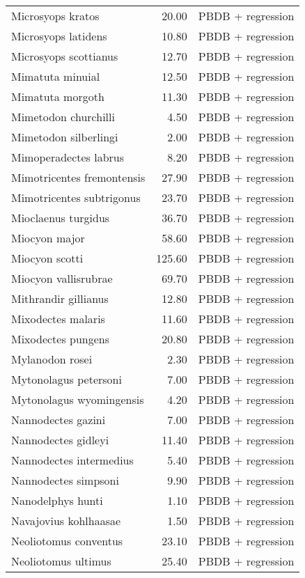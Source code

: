 \begin{table}[ht]
\begin{tabular}{lrl}
  Microsyops kratos & 20.00 & PBDB + regression \\ 
  Microsyops latidens & 10.80 & PBDB + regression \\ 
  Microsyops scottianus & 12.70 & PBDB + regression \\ 
  Mimatuta minuial & 12.50 & PBDB + regression \\ 
  Mimatuta morgoth & 11.30 & PBDB + regression \\ 
  Mimetodon churchilli & 4.50 & PBDB + regression \\ 
  Mimetodon silberlingi & 2.00 & PBDB + regression \\ 
  Mimoperadectes labrus & 8.20 & PBDB + regression \\ 
  Mimotricentes fremontensis & 27.90 & PBDB + regression \\ 
  Mimotricentes subtrigonus & 23.70 & PBDB + regression \\ 
  Mioclaenus turgidus & 36.70 & PBDB + regression \\ 
  Miocyon major & 58.60 & PBDB + regression \\ 
  Miocyon scotti & 125.60 & PBDB + regression \\ 
  Miocyon vallisrubrae & 69.70 & PBDB + regression \\ 
  Mithrandir gillianus & 12.80 & PBDB + regression \\ 
  Mixodectes malaris & 11.60 & PBDB + regression \\ 
  Mixodectes pungens & 20.80 & PBDB + regression \\ 
  Mylanodon rosei & 2.30 & PBDB + regression \\ 
  Mytonolagus petersoni & 7.00 & PBDB + regression \\ 
  Mytonolagus wyomingensis & 4.20 & PBDB + regression \\ 
  Nannodectes gazini & 7.00 & PBDB + regression \\ 
  Nannodectes gidleyi & 11.40 & PBDB + regression \\ 
  Nannodectes intermedius & 5.40 & PBDB + regression \\ 
  Nannodectes simpsoni & 9.90 & PBDB + regression \\ 
  Nanodelphys hunti & 1.10 & PBDB + regression \\ 
  Navajovius kohlhaasae & 1.50 & PBDB + regression \\ 
  Neoliotomus conventus & 23.10 & PBDB + regression \\ 
  Neoliotomus ultimus & 25.40 & PBDB + regression \\ 

\end{tabular}
\end{table}
